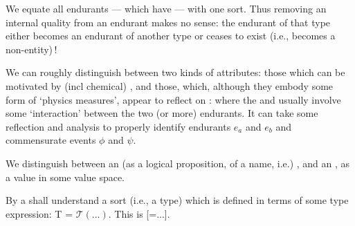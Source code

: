  \pind We equate all endurants --- which have \nyl \LLLL {} \nyl \HHHH --- with one sort.
\pind Thus removing an internal quality from an endurant \nyl makes no sense:
\begynd \LLLL
\pind the endurant of that type 
\pind either becomes an endurant of another type
\pind or ceases to exist (i.e., becomes a non-entity)\,!
\afslut \HHHH
\mnewfoil

\pind We can roughly distinguish between two kinds of attributes:
\begynd
\pind those which can be motivated \nyl by 
      (incl chemical) , and
\pind those, \LLLL
\begynd
\pind which, although they embody some form of `physics measures',
\pind appear to reflect on : \LLLL
\begynd
\pind {}
\pind {}
\afslut
\pind where the  and 
\pind usually involve some `interaction' between the two (or more) endurants.
\afslut \HHHH
\pind It can take some reflection and analysis to properly identify \LLLL
\begynd
\pind endurants $e_a$ and $e_b$ and 
\pind commensurate events $\phi$ and $\psi$.
\afslut\HHHH
{}
\afslut
\afslut

\label{kap4.Attribute Modeling Tools}

 \label{AQaAV} 
\begynd
\pind We distinguish between
\begynd
\pind an  (as a logical proposition, of a name, i.e.) , and
\pind an , as a value in some value space.
\afslut
\afslut

\begynd
\pind By a 
     shall understand a sort (i.e., a type) which is defined in terms of
    some type expression: \textsf{T = $\mathcal{T}(...)$}.
\pind This is  \textsf{[=...]}.
\afslut


